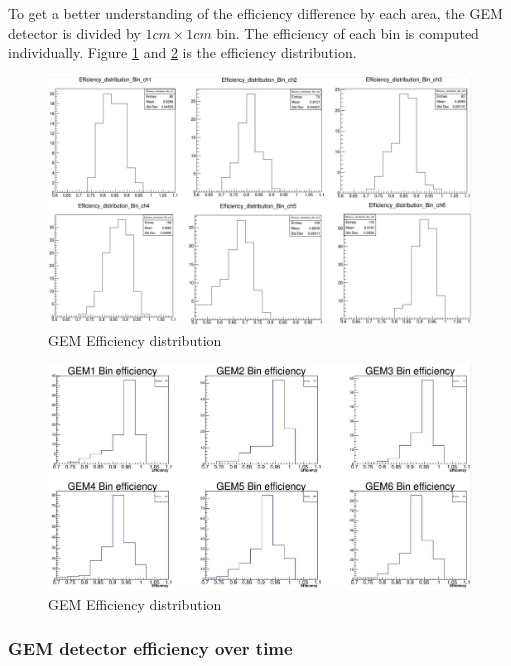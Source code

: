 To get a better understanding of the efficiency difference by each area, the GEM detector is divided by $1cm \times 1cm$ bin. The efficiency of each bin is computed individually. Figure \ref{fig:lhrs_gem_bin_efficiency} and \ref{fig:rhrs_gem_bin_efficiency} is the efficiency distribution.  
\begin{figure}[!htbp]
    \centering
    \includegraphics[width=\textwidth]{images/chap5/lhrs_gem_bin_efficiency.png}
    \caption{GEM Efficiency distribution}
    \label{fig:lhrs_gem_bin_efficiency}
\end{figure}

\begin{figure}[!htbp]
    \centering
    \includegraphics[width=\textwidth]{images/chap5/rhrs_gem_bin_efficiency.png}
    \caption{GEM Efficiency distribution}
    \label{fig:rhrs_gem_bin_efficiency}
\end{figure}

\subsubsection{GEM detector efficiency over time}

